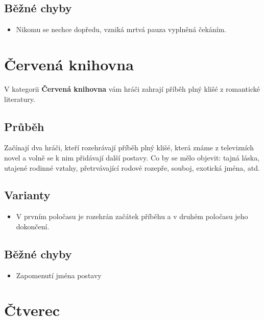\documentclass[main.tex]{subfiles}
\begin{document}
 
\subsection{ Běžné chyby } \begin{itemize}
\item  Nikomu se nechce dopředu, vzniká mrtvá pauza vyplněná čekáním.
\end{itemize}
 
 
 
 
 
\needspace{5cm} \section{Červená knihovna} \label{červená knihovna}  
 
 
V kategorii \textbf{Červená knihovna}{} vám hráči zahrají příběh plný klišé z romantické literatury. 
 
 
\subsection{Průběh} Začínají dva hráči, kteří rozehrávají příběh plný klišé, která známe z televizních novel a volně se k nim přidávají další postavy. Co by se mělo objevit: tajná láska, utajené rodinné vztahy, přetrvávající rodové rozepře, souboj, exotická jména, atd. 
 
\subsection{ Varianty } \begin{itemize}
\item V prvním poločasu je rozehrán začátek příběhu a v druhém poločasu jeho dokončení.
\end{itemize}
 
 
\subsection{ Běžné chyby } \begin{itemize}
\item Zapomenutí jména postavy
\end{itemize}
 
 
 
 
 
\needspace{5cm} \section{Čtverec} \label{čtverec}  
 
\end{document}
